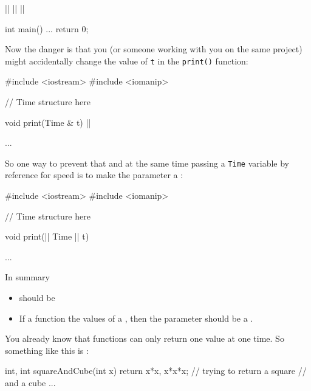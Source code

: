\begin{center}
\begin{center}
\begin{consolethree}[escapeinside=||]
||
|\EMPHASIZE{\{}|
|\EMPHASIZE{\}}|

int main()
{
  ...
  return 0;
}
\end{consolethree}

Now the danger is that you (or someone working with you on the same
project) might accidentally change the value of \texttt{t} in the \texttt{print()}
function:

\begin{consolethree}[escapeinside=||]
#include <iostream>
#include <iomanip>

// Time structure here

void print(Time & t)
{
    ||
}

...
\end{consolethree}

So one way to prevent that and at the same time passing a \texttt{Time}
variable by reference for speed is to make the parameter a
:

\begin{consolethree}[escapeinside=||]
#include <iostream>
#include <iomanip>

// Time structure here

void print(|| Time |\EMPHASIZE{\&}| t)
{
}

...
\end{consolethree}

In summary
\begin{itemize}
\item {} should be 
\item If a function  the values of a
, then the parameter should be a
.
\end{itemize}




\newpage{}

You already know that functions can only return one value at one time.
So something like this is :

\begin{consolethree}[escapeinside=||]
int, int squareAndCube(int x)
{
  return x*x, x*x*x; // trying to return a square
                     // and a cube ...
}
\end{consolethree}


\end{center}
\end{center}

